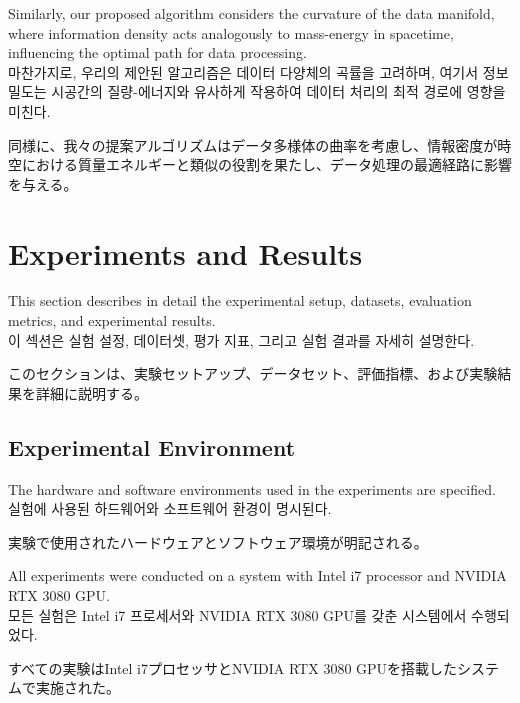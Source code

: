 \documentclass[preprint,12pt]{elsarticle}
\begin{document}
Similarly, our proposed algorithm considers the curvature of the data manifold, where information density acts analogously to mass-energy in spacetime, influencing the optimal path for data processing. \\
마찬가지로, 우리의 제안된 알고리즘은 데이터 다양체의 곡률을 고려하며, 여기서 정보 밀도는 시공간의 질량-에너지와 유사하게 작용하여 데이터 처리의 최적 경로에 영향을 미친다. \\
\begin{CJK}{UTF8}{min}
同様に、我々の提案アルゴリズムはデータ多様体の曲率を考慮し、情報密度が時空における質量エネルギーと類似の役割を果たし、データ処理の最適経路に影響を与える。
\end{CJK}

\section{Experiments and Results}
\label{sec:experiments}

This section describes in detail the experimental setup, datasets, evaluation metrics, and experimental results. \\
이 섹션은 실험 설정, 데이터셋, 평가 지표, 그리고 실험 결과를 자세히 설명한다. \\
\begin{CJK}{UTF8}{min}
このセクションは、実験セットアップ、データセット、評価指標、および実験結果を詳細に説明する。
\end{CJK}

\subsection{Experimental Environment}
The hardware and software environments used in the experiments are specified. \\
실험에 사용된 하드웨어와 소프트웨어 환경이 명시된다. \\
\begin{CJK}{UTF8}{min}
実験で使用されたハードウェアとソフトウェア環境が明記される。
\end{CJK}

All experiments were conducted on a system with Intel i7 processor and NVIDIA RTX 3080 GPU. \\
모든 실험은 Intel i7 프로세서와 NVIDIA RTX 3080 GPU를 갖춘 시스템에서 수행되었다. \\
\begin{CJK}{UTF8}{min}
すべての実験はIntel i7プロセッサとNVIDIA RTX 3080 GPUを搭載したシステムで実施された。
\end{CJK}
\end{document}
